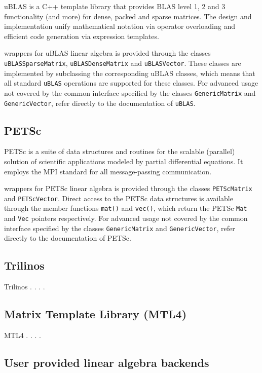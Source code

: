 uBLAS is a C++ template library that provides BLAS level 1, 2 and 3
functionality (and more) for dense, packed and sparse matrices.
The design and implementation unify mathematical notation via operator
overloading and efficient code generation via expression templates.

\dolfin{} wrappers for uBLAS linear algebra is provided through the
classes \texttt{uBLASSparseMatrix}, \texttt{uBLASDenseMatrix} and
\texttt{uBLASVector}. These classes are implemented by subclassing the
corresponding uBLAS classes, which means that all standard
\texttt{uBLAS} operations are supported for these classes. For
advanced usage not covered by the common \dolfin{} interface specified
by the classes \texttt{GenericMatrix} and \texttt{GenericVector},
refer directly to the documentation of \texttt{uBLAS}.
\subsection{PETSc}
%
PETSc is a suite of data structures and routines for the scalable
(parallel) solution of scientific applications modeled by partial
differential equations. It employs the MPI standard for all 
message-passing communication.

\dolfin{} wrappers for PETSc linear algebra is provided through the
classes \texttt{PETScMatrix} and \texttt{PETScVector}. Direct access
to the PETSc data structures is available through the member functions
\texttt{mat()} and \texttt{vec()}, which return the PETSc \texttt{Mat}
and \texttt{Vec} pointers respectively. For advanced usage not covered
by the common \dolfin{} interface specified by the classes
\texttt{GenericMatrix} and \texttt{GenericVector}, refer directly to
the documentation of PETSc.

\subsection{Trilinos}
%
Trilinos . . . . 
\subsection{Matrix Template Library (MTL4)}
%
MTL4 . . . . 
\subsection{User provided linear algebra backends}
%

